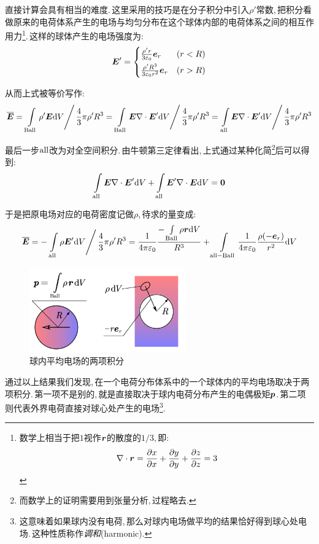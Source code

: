 直接计算会具有相当的难度.\,这里采用的技巧是在分子积分中引入$\rho'$常数,\,把积分看做原来的电荷体系产生的电场与均匀分布在这个球体内部的电荷体系之间的相互作用力\footnote{数学上相当于把$1$视作$\boldsymbol{r}$的散度的$1/3$,\,即:
\[\nabla\cdot \boldsymbol{r}=\frac{\partial x}{\partial x}+\frac{\partial y}{\partial y}+\frac{\partial z}{\partial z}=3\]
}.\,这样的球体产生的电场强度为:
\[\boldsymbol{E}'=\begin{cases} \frac{\rho' r}{3\varepsilon_0}\boldsymbol{e}_r & (r<R)\\[4pt] \frac{\rho' R^3}{3\varepsilon_0 r^2}\boldsymbol{e}_r & (r>R) \end{cases}\]

从而上式被等价写作:
\[\overline{\boldsymbol{E}}=\left.\int\limits_{\rm Ball}\rho' \boldsymbol{E} \textrm{d} V\right/ \frac{4}{3}\pi \rho' R^3=\left.\int\limits_{\rm Ball} \boldsymbol{E}\nabla\cdot\boldsymbol{E}'  \textrm{d} V\right/ \frac{4}{3}\pi \rho' R^3=\left.\int\limits_{\rm all} \boldsymbol{E}\nabla\cdot\boldsymbol{E}'  \textrm{d} V\right/ \frac{4}{3}\pi \rho' R^3\]

最后一步${\rm all}$改为对全空间积分.\,由牛顿第三定律看出,\,上式通过某种化简\footnote{而数学上的证明需要用到张量分析,\,过程略去.}后可以得到:
\[\int\limits_{\rm all} \boldsymbol{E}\nabla\cdot\boldsymbol{E}'  \textrm{d} V+\int\limits_{\rm all} \boldsymbol{E}'\nabla\cdot\boldsymbol{E}  \textrm{d} V=\boldsymbol{0}\]

于是把原电场对应的电荷密度记做$\rho$,\,待求的量变成:
\[\overline{\boldsymbol{E}}=-\left.\int\limits_{\rm all}\rho \boldsymbol{E}' \textrm{d} V\right/ \frac{4}{3}\pi \rho' R^3=\frac{1}{4\pi\varepsilon_0}\frac{-\int\limits_{\rm Ball}\rho \boldsymbol{r}\textrm{d} V}{R^3}+\int\limits_{{\rm all}-{\rm Ball}}\frac{1}{4\pi\varepsilon_0}\frac{\rho(-\boldsymbol{e}_r)}{r^2}\textrm{d} V\]

\begin{figure}[H]
\centering
\includegraphics[width=0.6\textwidth]{image/7-1-17.png}
\caption{球内平均电场的两项积分}
\end{figure}

通过以上结果我们发现,\,在一个电荷分布体系中的一个球体内的平均电场取决于两项积分.\,第一项不是别的,\,就是直接取决于球内电荷分布产生的电偶极矩$\boldsymbol{p}$.\,第二项则代表外界电荷直接对球心处产生的电场\footnote{这意味着如果球内没有电荷,\,那么对球内电场做平均的结果恰好得到球心处电场.\,这种性质称作\emph{调和}(harmonic).}.


